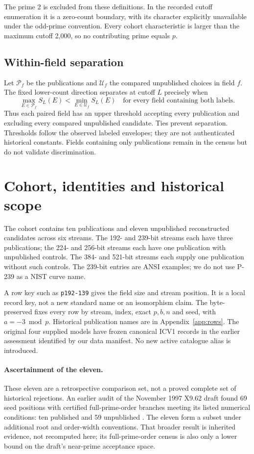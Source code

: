 \documentclass[11pt]{article}
\begin{document}
The prime 2 is excluded from these definitions. In the recorded cutoff
enumeration it is a zero-count boundary, with its character explicitly
unavailable under the odd-prime convention. Every cohort characteristic is
larger than the maximum cutoff 2,000, so no contributing prime equals $p$.

\subsection{Within-field separation}
Let $\mathcal P_f$ be the publications and $\mathcal U_f$ the compared
unpublished choices in field $f$. The fixed lower-count direction separates
at cutoff $L$ precisely when
\begin{equation}
 \max_{E\in\mathcal P_f}S_L(E)<\min_{E\in\mathcal U_f}S_L(E)
 \quad\text{for every field containing both labels}.
 \label{eq:separator}
\end{equation}
Thus each paired field has an upper threshold accepting every publication
and excluding every compared unpublished candidate. Ties prevent separation.
Thresholds follow the observed labeled envelopes; they are not authenticated
historical constants. Fields containing only publications remain in the
census but do not validate discrimination.

\section{Cohort, identities and historical scope}
The cohort contains ten publications and eleven unpublished reconstructed
candidates across six streams. The 192- and 239-bit streams each have three
publications; the 224- and 256-bit streams each have one publication with
unpublished controls. The 384- and 521-bit streams each supply one
publication without such controls. The 239-bit entries are ANSI examples;
we do not use P-239 as a NIST curve name.

A row key such as \texttt{p192-139} gives the field size and stream position.
It is a local record key, not a new standard name or an isomorphism claim.
The byte-preserved  fixes every row by stream, index,
exact $p,b,n$ and seed, with $a=-3\bmod p$. Historical publication names are
in Appendix~\ref{app:rows}. The original four supplied models have frozen
canonical ICV1 records in the earlier assessment identified by our data
manifest. No new active catalogue alias is introduced.

\paragraph{Ascertainment of the eleven.}
These eleven are a retrospective comparison set, not a proved complete
set of historical rejections. An earlier audit of the November 1997
X9.62 draft found 69 seed positions with certified full-prime-order
branches meeting its listed numerical conditions: ten published and
59 unpublished \cite{x962draft,acceptanceaudit}. The eleven form a subset
under additional root and order-width conventions. That broader result
is inherited evidence, not recomputed here; its full-prime-order census is
also only a lower bound on the draft's near-prime acceptance space.
\end{document}
